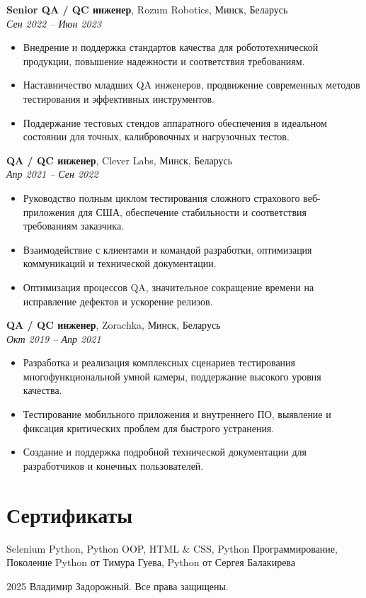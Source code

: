 \documentclass[11pt,a4paper]{article}
\begin{document}
\textbf{Senior QA / QC инженер}, Rozum Robotics, Минск, Беларусь \\
\textit{Сен 2022 -- Июн 2023}
\begin{itemize}
  \item Внедрение и поддержка стандартов качества для робототехнической продукции, повышение надежности и соответствия требованиям.
  \item Наставничество младших QA инженеров, продвижение современных методов тестирования и эффективных инструментов.
  \item Поддержание тестовых стендов аппаратного обеспечения в идеальном состоянии для точных, калибровочных и нагрузочных тестов.
\end{itemize}

\textbf{QA / QC инженер}, Clever Labs, Минск, Беларусь \\
\textit{Апр 2021 -- Сен 2022}
\begin{itemize}
  \item Руководство полным циклом тестирования сложного страхового веб-приложения для США, обеспечение стабильности и соответствия требованиям заказчика.
  \item Взаимодействие с клиентами и командой разработки, оптимизация коммуникаций и технической документации.
  \item Оптимизация процессов QA, значительное сокращение времени на исправление дефектов и ускорение релизов.
\end{itemize}

\textbf{QA / QC инженер}, Zorachka, Минск, Беларусь \\
\textit{Окт 2019 -- Апр 2021}
\begin{itemize}
  \item Разработка и реализация комплексных сценариев тестирования многофункциональной умной камеры, поддержание высокого уровня качества.
  \item Тестирование мобильного приложения и внутреннего ПО, выявление и фиксация критических проблем для быстрого устранения.
  \item Создание и поддержка подробной технической документации для разработчиков и конечных пользователей.
\end{itemize}

\section*{Сертификаты}
Selenium Python, Python OOP, HTML \& CSS, Python Программирование, Поколение Python от Тимура Гуева, Python от Сергея Балакирева

\vfill
\begin{center}
  \textcopyright{} 2025 Владимир Задорожный. Все права защищены.
\end{center}
\end{document}
